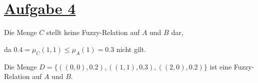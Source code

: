 \section*{\underline{Aufgabe 4}}

Die Menge $C$ stellt keine Fuzzy-Relation auf $A$ und $B$ dar,

da $0.4 = \mu_C(1,1) \leq \mu_A(1) = 0.3$ nicht gilt.

Die Menge $D = \{((0,0), 0.2),((1,1), 0.3),((2,0), 0.2)\}$ ist eine Fuzzy-Relation auf $A$ und $B$.